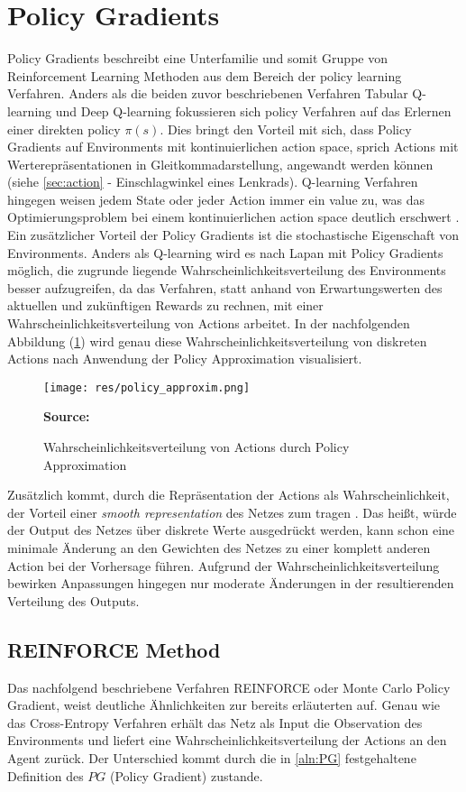\documentclass[11pt]{scrartcl}
\newcommand{\source}[1]{\vspace{-5pt} \caption*{\hfill \textbf{Source:} {#1}} }
\begin{document}
\newpage
\section{Policy Gradients}
Policy Gradients beschreibt eine Unterfamilie und somit Gruppe von Reinforcement Learning 
Methoden aus dem Bereich der policy learning Verfahren. Anders als die beiden zuvor
beschriebenen Verfahren Tabular Q-learning und Deep Q-learning fokussieren sich policy
Verfahren auf das Erlernen einer direkten policy $\pi(s)$. Dies bringt den Vorteil mit sich,
dass Policy Gradients auf Environments mit kontinuierlichen action space, sprich Actions mit
Werterepräsentationen in Gleitkommadarstellung, angewandt werden können (siehe
\ref{sec:action}  - Einschlagwinkel eines Lenkrads). Q-learning Verfahren
hingegen weisen jedem State oder jeder Action immer ein value zu, was das Optimierungsproblem
bei einem kontinuierlichen action space deutlich erschwert \cite[~S.242]{L2018}. Ein
zusätzlicher Vorteil der Policy Gradients ist die stochastische Eigenschaft von Environments.
Anders als Q-learning wird es nach Lapan\cite[~S.242]{L2018} mit Policy Gradients möglich,
die zugrunde liegende Wahrscheinlichkeitsverteilung des Environments besser aufzugreifen,
da das Verfahren, statt anhand von Erwartungswerten des aktuellen und zukünftigen Rewards zu
rechnen, mit einer Wahrscheinlichkeitsverteilung von Actions arbeitet. In der nachfolgenden
Abbildung (\ref{fig:prob-dist-pg}) wird genau diese Wahrscheinlichkeitsverteilung von
diskreten Actions nach Anwendung der Policy Approximation visualisiert.

\begin{figure}[htp]
\centering
\texttt{[image: res/policy\_approxim.png]}
\caption{Wahrscheinlichkeitsverteilung von Actions durch Policy Approximation}
\source{\cite[~S.243 - Chapter 9 - Figure 1]{L2018}}
\label{fig:prob-dist-pg}
\end{figure}

Zusätzlich kommt, durch die Repräsentation der Actions als Wahrscheinlichkeit, der Vorteil einer
\textit{smooth representation} des Netzes zum tragen \cite[~S.243]{L2018}. 
Das heißt, würde der Output des Netzes über diskrete Werte ausgedrückt werden, kann schon eine
minimale Änderung an den Gewichten des Netzes zu einer komplett anderen Action bei der
Vorhersage führen. Aufgrund der Wahrscheinlichkeitsverteilung bewirken Anpassungen hingegen
nur moderate Änderungen in der resultierenden Verteilung des Outputs.


\subsection{REINFORCE Method}
Das nachfolgend beschriebene Verfahren REINFORCE oder Monte Carlo Policy Gradient, weist
deutliche Ähnlichkeiten zur bereits erläuterten  auf.
Genau wie das Cross-Entropy Verfahren erhält das Netz als Input die Observation des
Environments und liefert eine Wahrscheinlichkeitsverteilung der Actions an den Agent
zurück. Der Unterschied kommt durch die in \autoref{aln:PG} festgehaltene Definition
des $PG$ (Policy Gradient) zustande.
\end{document}
